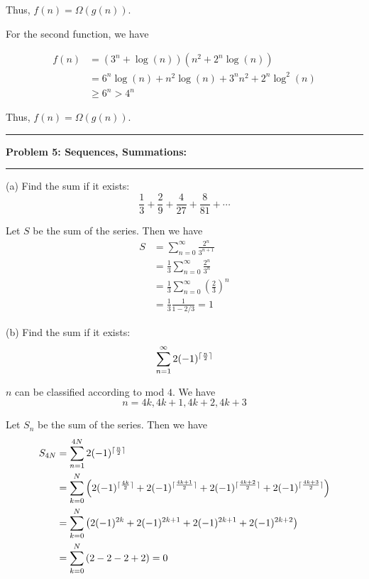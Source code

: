 \documentclass[11pt]{article}
\DeclarePairedDelimiter{\ceil}{\lceil}{\rceil}
\newcommand\question[2]{\vspace{.25in}\hrule\textbf{#1: #2}\vspace{.5em}\hrule\vspace{.10in}}
\begin{document}
Thus, $f(n) = \Omega(g(n))$.

For the second function, we have

\begin{align*}
    f(n) &= (3^n +\log(n))(n^2 +2^n\log(n))\\
         &= 6^n\log(n) + n^2\log(n) + 3^nn^2 + 2^n\log^2(n)\\
         &\ge 6^n > 4^n
\end{align*}

Thus, $f(n) = \Omega(g(n))$.

\question{Problem 5: Sequences, Summations}{}

(a) Find the sum if it exists:
\begin{equation}
    \frac{1}{3} + \frac{2}{9} + \frac{4}{27} + \frac{8}{81} + \cdots
\end{equation}

\solution

Let $S$ be the sum of the series. Then we have
\begin{align*}
    S &= \sum_{n=0}^{\infty}\frac{2^n}{3^{n+1}}\\
      &= \frac{1}{3}\sum_{n=0}^{\infty}\frac{2^n}{3^n}\\
      &= \frac{1}{3}\sum_{n=0}^{\infty}\left(\frac{2}{3}\right)^n\\
      &= \frac{1}{3}\frac{1}{1-2/3} = 1
\end{align*}

(b) Find the sum if it exists:
\begin{equation}
    \sum_{n=1}^{\infty} 2(-1)^{\ceil{\frac{n}{2}}}
\end{equation}

\solution

$n$ can be classified according to mod $4$. We have
\[n = 4k, 4k+1, 4k+2, 4k+3\]


Let $S_{n}$ be the sum of the series. Then we have
\begin{align*}
    S_{4N} &= \sum_{n=1}^{4N} 2(-1)^{\ceil{\frac{n}{2}}}\\
      &= \sum_{k=0}^{N} \left(2(-1)^{\ceil{\frac{4k}{2}}} + 2(-1)^{\ceil{\frac{4k+1}{2}}} + 2(-1)^{\ceil{\frac{4k+2}{2}}} + 2(-1)^{\ceil{\frac{4k+3}{2}}}\right)\\
      &= \sum_{k=0}^{N} \left(2(-1)^{2k} + 2(-1)^{2k+1} + 2(-1)^{2k+1} + 2(-1)^{2k+2}\right)\\
      &= \sum_{k=0}^{N} \left(2 - 2 - 2 + 2\right) = 0\\
\end{align*}
\end{document}
